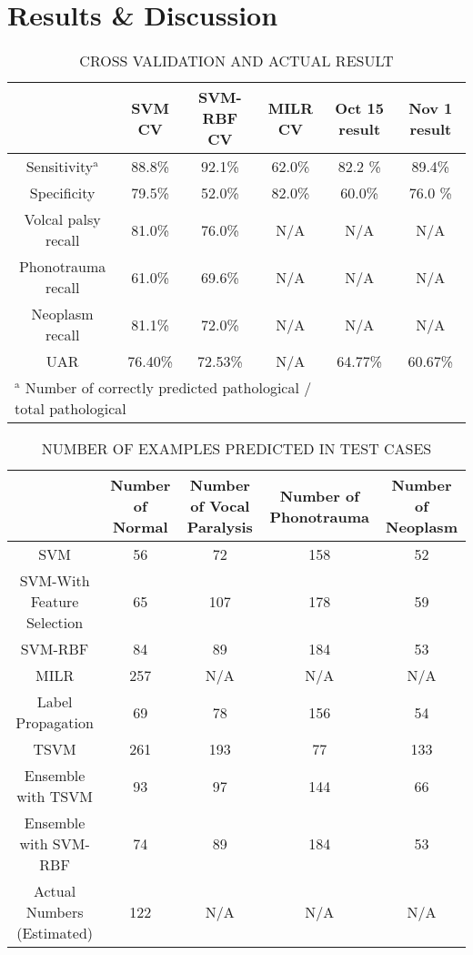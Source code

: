 \section{Results \& Discussion}
\begin{table*}[htbp]
	\caption{CROSS VALIDATION AND ACTUAL RESULT}
	\begin{center}
		\begin{tabular}{|c|c|c|c|c|c|}
			\hline
			 & SVM CV & SVM-RBF CV & MILR CV & Oct 15 result & Nov 1 result \\
			\hline
			Sensitivity$^{\mathrm{a}}$  & 88.8\%& 92.1\% & 62.0\% & 82.2 \% & 89.4\% \\
			\hline
			Specificity & 79.5\% & 52.0\%& 82.0\%& 60.0\% & 76.0 \% \\
			\hline
			Volcal palsy recall & 81.0\% &76.0\%& N/A & N/A & N/A \\
			\hline
			Phonotrauma recall & 61.0\% &69.6\%& N/A& N/A& N/A\\
			\hline
			Neoplasm recall & 81.1\% & 72.0\%& N/A& N/A& N/A \\
			\hline
			UAR & 76.40\% &72.53\% & N/A& 64.77\% & 60.67\%\\
			\hline
			\multicolumn{4}{l}{$^{\mathrm{a}}$ Number of correctly predicted pathological / total pathological}
		\end{tabular}
		\label{tab:1}
	\end{center}
\end{table*}

\begin{table*}[htbp]
	\caption{NUMBER OF EXAMPLES PREDICTED IN TEST CASES}
	\begin{center}
		\begin{tabular}{|c|c|c|c|c|}
			\hline
			& Number of Normal & Number of Vocal Paralysis & Number of Phonotrauma & Number of Neoplasm \\
			\hline
			SVM & 56 & 72 &158&52 \\
			\hline
			SVM-With Feature Selection & 65 & 107 & 178  & 59 \\
			\hline
			SVM-RBF & 84 & 89 &184 & 53 \\
			\hline
			MILR & 257 & N/A & N/A& N/A\\
			\hline
			Label Propagation & 69 & 78&156 & 54 \\
			\hline
			TSVM & 261 &193&77&133\\
			\hline
			Ensemble with TSVM & 93&97&144&66\\
			\hline
			Ensemble with SVM-RBF & 74&89&184&53\\
			\hline
			Actual Numbers (Estimated)& 122&N/A&N/A&N/A  \\
			\hline
		\end{tabular}
		\label{tab:2}
	\end{center}
\end{table*}

